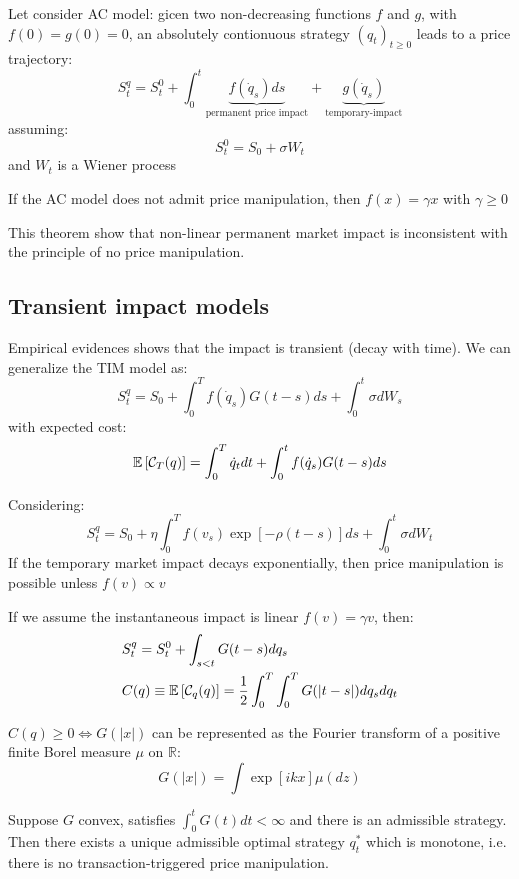 Let consider AC model: gicen two non-decreasing functions $f$ and $g$, with $f(0) =g(0) = 0$, an absolutely contionuous strategy $(q_t)_{t\geq 0}$ leads to a price trajectory:
\[
S^q_t = S^0_t + \int_0^t \underbrace{f(\dot{q}_s)ds}_{\text{permanent price impact}} + \underbrace{g(\dot{q}_s)}_{\text{temporary-impact}}
\]
assuming:
\[
S_t^0 =S_0 + \sigma W_t
\]
and $W_t$ is a Wiener process
\begin{mytheorem}
	If the AC model does not admit price manipulation, then $f(x)=\gamma x$ with $\gamma \geq 0$
\end{mytheorem}
This theorem show that non-linear permanent market impact is inconsistent with the principle of no price manipulation.
\subsection{Transient impact models}
Empirical evidences shows that the impact is transient (decay with time). We can generalize the TIM model as:
\[
S_t^q = S_0 + \int_0^T f(\dot{q}_s)G(t-s)ds + \int_0^t \sigma dW_s
\]
with expected cost:
\[
\mathbb{E}\left[\mathcal{C}_T(q)\right] = \int_0^T \dot{q}_tdt + \int_0^t f(\dot{q}_s)G(t-s)ds
\]
\begin{mytheorem}
Considering:
\[
S_t^q = S_0 + \eta \int_0^T f(v_s)\exp[-\rho (t-s)] ds + \int_0^t \sigma dW_t
\]
If the temporary market impact decays exponentially, then price manipulation is possible unless $f(v)\propto v$
\end{mytheorem}
If we assume the instantaneous impact is linear $f(v) = \gamma v$, then:
\begin{align*}
	&S_t^q = S_t^0 + \int_{s<t} G(t-s) dq_s \\
	& C(q) \equiv \mathbb{E}\left[\mathcal{C}_q(q)\right] = \frac{1}{2} \int_0^T \int_0^T G(|t-s|)dq_sdq_t
\end{align*}
\begin{mytheorem}
	$C(q) \geq 0 \iff G(|x|)$ can be represented as the Fourier transform of a positive finite Borel measure $\mu$ on $\mathbb{R}$:
	\[
	G(|x|) = \int \exp[ikx]\mu(dz)
	\]
\end{mytheorem}
\begin{mytheorem}
	Suppose $G$ convex, satisfies $\int_0^t G(t)dt <\infty$ and there is an admissible strategy. Then there exists a unique admissible optimal strategy $q^*_t$ which is monotone, i.e. there is no transaction-triggered price manipulation.
\end{mytheorem}
